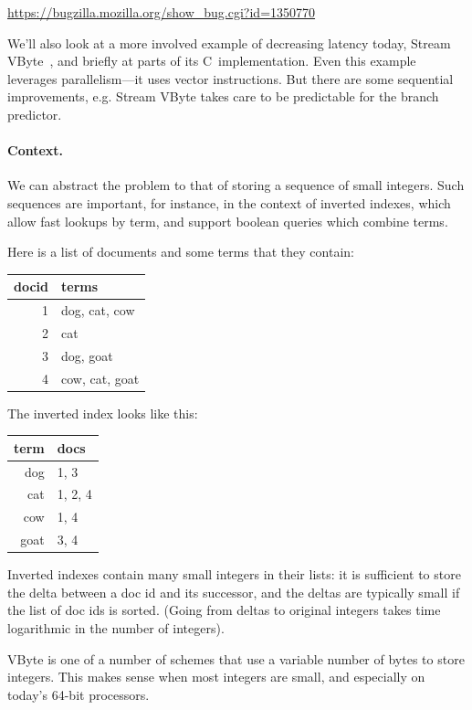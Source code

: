\documentclass[a4paper]{report}
\newcommand{\CPP}{C\nolinebreak\hspace{-.05em}\raisebox{.4ex}{\tiny\bf +}\nolinebreak\hspace{-.10em}\raisebox{.4ex}{\tiny\bf +}}
\def\CPP{{C\nolinebreak[4]\hspace{-.05em}\raisebox{.4ex}{\tiny\bf ++}}}
\begin{document}
\begin{center}
\url{https://bugzilla.mozilla.org/show_bug.cgi?id=1350770}
\end{center}

We'll also look at a more involved example of decreasing latency today, Stream VByte~\cite{LEMIRE20181}, and briefly at parts of its \CPP~implementation.
Even this example leverages parallelism---it uses vector instructions. But there
are some sequential improvements, e.g. Stream VByte takes care to be predictable
for the branch predictor.

\paragraph{Context.} We can abstract the problem to that of storing a sequence of small integers.
Such sequences are important, for instance, in the context of inverted indexes, which allow
fast lookups by term, and support boolean queries which combine terms.

Here is a list of documents and some terms that they contain:
\begin{center}
\begin{tabular}{r|l}
docid & terms \\ \hline
1 & dog, cat, cow\\
2 & cat\\
3 & dog, goat\\
4 & cow, cat, goat\\
\end{tabular}
\end{center}

The inverted index looks like this:
\begin{center}
\begin{tabular}{r|l}
term & docs \\ \hline
dog & 1, 3 \\
cat & 1, 2, 4 \\
cow & 1, 4 \\
goat & 3, 4
\end{tabular}
\end{center}

Inverted indexes contain many small integers in their lists: it is
sufficient to store the delta between a doc id and its successor, and
the deltas are typically small if the list of doc ids is sorted.
(Going from deltas to original integers takes time logarithmic
in the number of integers).

VByte is one of a number of schemes that use a variable number of
bytes to store integers.  This makes sense when most integers are
small, and especially on today's 64-bit processors.
\end{document}
